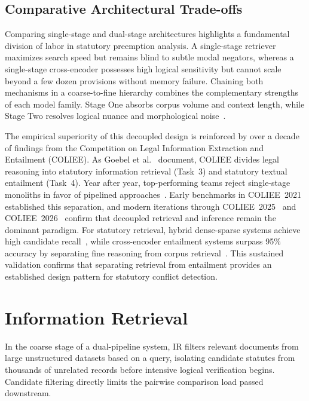     \subsection{Comparative Architectural Trade-offs}
    Comparing single-stage and dual-stage architectures highlights a fundamental division of labor in statutory preemption analysis. A single-stage retriever maximizes search speed but remains blind to subtle modal negators, whereas a single-stage cross-encoder possesses high logical sensitivity but cannot scale beyond a few dozen provisions without memory failure. Chaining both mechanisms in a coarse-to-fine hierarchy combines the complementary strengths of each model family. Stage One absorbs corpus volume and context length, while Stage Two resolves logical nuance and morphological noise~\cite{louis2022a}.

    The empirical superiority of this decoupled design is reinforced by over a decade of findings from the Competition on Legal Information Extraction and Entailment (COLIEE). As Goebel et al.~\cite{goebel2026an} document, COLIEE divides legal reasoning into statutory information retrieval (Task~3) and statutory textual entailment (Task~4). Year after year, top-performing teams reject single-stage monoliths in favor of pipelined approaches~\cite{althammer2021dossiercoliee}. Early benchmarks in COLIEE~2021 established this separation, and modern iterations through COLIEE~2025~\cite{coliee2025proceedings} and COLIEE~2026~\cite{coliee2026proceedings} confirm that decoupled retrieval and inference remain the dominant paradigm. For statutory retrieval, hybrid dense-sparse systems achieve high candidate recall~\cite{ngo2026nowj}, while cross-encoder entailment systems surpass 95\% accuracy by separating fine reasoning from corpus retrieval~\cite{alshehri2026cross, tran2026enhancing}. This sustained validation confirms that separating retrieval from entailment provides an established design pattern for statutory conflict detection.

    
\section{Information Retrieval}
In the coarse stage of a dual-pipeline system, IR filters relevant documents from large unstructured datasets based on a query, isolating candidate statutes from thousands of unrelated records before intensive logical verification begins. Candidate filtering directly limits the pairwise comparison load passed downstream.

